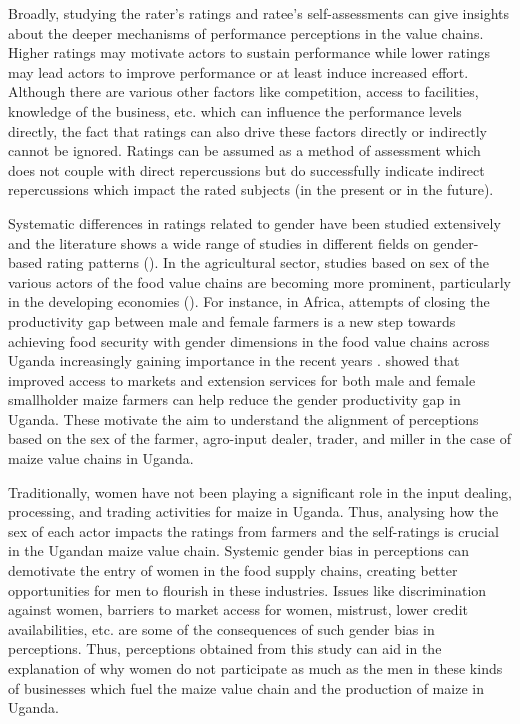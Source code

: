\documentclass[12pt,english]{article}\usepackage[]{graphicx}\usepackage[]{color}
\begin{document}
\begin{onehalfspace}
Broadly, studying the rater's ratings and ratee's self-assessments
can give insights about the deeper mechanisms of performance perceptions
in the value chains. Higher ratings may motivate actors to sustain
performance while lower ratings may lead actors to improve performance
or at least induce increased effort. Although there are various other
factors like competition, access to facilities, knowledge of the business,
etc. which can influence the performance levels directly, the fact
that ratings can also drive these factors directly or indirectly cannot
be ignored. Ratings can be assumed as a method of assessment which
does not couple with direct repercussions but do successfully indicate
indirect repercussions which impact the rated subjects (in the present
or in the future).

Systematic differences in ratings related to gender have been studied
extensively and the literature shows a wide range of studies in different
fields on gender-based rating patterns (\citealp{Mitchell2018,Furnham2005,Patiar2008}).
In the agricultural sector, studies based on sex of the various actors
of the food value chains are becoming more prominent, particularly
in the developing economies (\citealp{doi:10.1080/00220388.2012.663902,barrientos2019,Kruijssen2018,Mnimbo2017}).
For instance, in Africa, attempts of closing the productivity gap
between male and female farmers is a new step towards achieving food
security with gender dimensions in the food value chains across Uganda
increasingly gaining importance in the recent years \citep{akite2018,bamanyaki2020,nchanji2020}.
\citet{Larson2016} showed that improved access to markets and extension
services for both male and female smallholder maize farmers can help
reduce the gender productivity gap in Uganda. These motivate the aim
to understand the alignment of perceptions based on the sex of the
farmer, agro-input dealer, trader, and miller in the case of maize
value chains in Uganda.

Traditionally, women have not been playing a significant role in the
input dealing, processing, and trading activities for maize in Uganda.
Thus, analysing how the sex of each actor impacts the ratings from
farmers and the self-ratings is crucial in the Ugandan maize value
chain. Systemic gender bias in perceptions can demotivate the entry
of women in the food supply chains, creating better opportunities
for men to flourish in these industries. Issues like discrimination
against women, barriers to market access for women, mistrust, lower
credit availabilities, etc. are some of the consequences of such gender
bias in perceptions. Thus, perceptions obtained from this study can
aid in the explanation of why women do not participate as much as
the men in these kinds of businesses which fuel the maize value chain
and the production of maize in Uganda. 


\end{onehalfspace}
\end{document}
